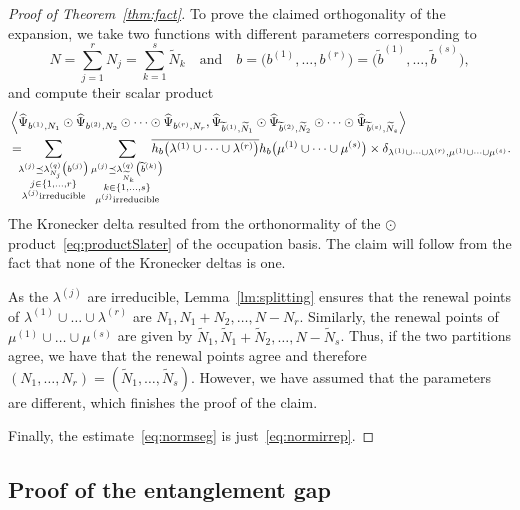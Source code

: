 \documentclass[letterpaper, DIV=17]{scrartcl}
\numberwithin{equation}{section}
\theoremstyle{definition}
\newcommand{\irr}{\small \textrm{irreducible}}
\begin{document}
\begin{proof}[Proof of Theorem~\ref{thm:fact}]
To prove the claimed orthogonality of the expansion, we take two functions with different parameters corresponding to 
$$ N = \sum_{j=1}^r N_j = \sum_{k=1}^s \widetilde N_k \quad \mbox{and} \quad b= \big(b^{(1)} , \dots , b^{(r)} \big)  =  \big(\widetilde b^{(1)} , \dots , \widetilde b^{(s)} \big) , $$ 
and compute their scalar product
\begin{align*}
& \left\langle  \widehat \Psi_{b^{(1)},N_1} \odot  \widehat \Psi_{b^{(2)},N_2} \odot \cdots \odot  \widehat \Psi_{b^{(r)},N_r}  ,   \widehat \Psi_{\widetilde b^{(1)},\widetilde N_1} \odot  \widehat \Psi_{\widetilde b^{(2)},\widetilde N_2} \odot \cdots \odot  \widehat \Psi_{\widetilde b^{(s)},\widetilde N_s} \right\rangle \\
& =\mkern-10mu  \sum_{\substack{ \lambda^{(j)} \preceq  \lambda_{N_j}^{(q)}\big(b^{(j)}\big) \\  j \in \{ 1, \dots , r \}  \\ \lambda^{(j)} \irr}}   \sum_{\substack{ \mu^{(j)} \preceq  \lambda_{\widetilde N_k}^{(q)}\big(\widetilde b^{(k)}\big) \\  k \in \{ 1, \dots , s \}  \\ \mu^{(j)} \irr}}  \mkern-20mu \overline{h_b\big( \lambda^{(1)} \cup \dots \cup  \lambda^{(r)} \big)} h_b\big( \mu^{(1)} \cup \dots \cup  \mu^{(s)} \big) \times  \delta_{ \lambda^{(1)} \cup \dots \cup  \lambda^{(r)} , \mu^{(1)} \cup \dots \cup  \mu^{(s)}}  .
\end{align*}
The Kronecker delta resulted from the orthonormality of the $ \odot $ product~\eqref{eq:productSlater} of the occupation basis. The claim will follow from the fact that none of the Kronecker deltas is one. 

As the $\lambda^{(j)}$ are irreducible, Lemma~\ref{lm:splitting} ensures that the renewal points of $\lambda^{(1)}\cup \dots \cup \lambda^{(r)}$ are $N_1, N_1+N_2, \dots, N-N_r$. Similarly, the renewal points of $\mu^{(1)}\cup \dots \cup \mu^{(s)}$ are given by $\tilde{N}_1, \tilde{N}_1+\tilde{N}_2, \dots, N-\tilde{N}_s$. Thus, if the two partitions agree, we have that the renewal points agree and therefore $(N_1, \dots, N_r)=(\tilde{N}_1, \dots, \tilde{N}_s)$. However, we have assumed that the parameters are different, which finishes the proof of the claim. 


Finally, the estimate~\eqref{eq:normseg} is just~\eqref{eq:normirrep}.
\end{proof} 


\subsection{Proof of the entanglement gap}\label{sec:Egap}
\end{document}
